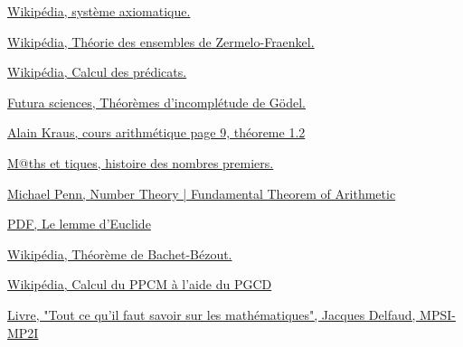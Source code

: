 \documentclass[12pt]{article}
\begin{document}
\begin{enumerate}[label=\text{[}\arabic*\text{]}]
\item \href{https://fr.wikipedia.org/wiki/Système_axiomatique}{Wikipédia, système axiomatique.} \label{itm:SysAxi}

\item \href{https://fr.wikipedia.org/wiki/Théorie_des_ensembles_de_Zermelo-Fraenkel}{Wikipédia, Théorie des ensembles de Zermelo-Fraenkel.} \label{itm:ThrZFC}

\item \href{https://fr.wikipedia.org/wiki/Calcul_des_prédicats}{Wikipédia, Calcul des prédicats.} \label{itm:CalPre}

\item \href{https://www.futura-sciences.com/sciences/definitions/mathematiques-theoreme-incompletude-godel-13701/}{Futura sciences, Théorèmes d'incomplétude de Gödel.} \label{itm:ThmGdl}

\item \href{https://webusers.imj-prg.fr/~alberto.minguez/Enseignement/Arithmetique_files/Cours-lm220-Kraus.pdf}{Alain Kraus, cours arithmétique page 9, théoreme 1.2} \label{itm:divprem} 

\item \href{https://www.maths-et-tiques.fr/index.php/histoire-des-maths/nombres/les-nombres-premiers}{M@ths et tiques, histoire des nombres premiers.} \label{histoire}

\item \href{https://www.youtube.com/watch?v=VkhJp2Ue_r0&t=114s}{Michael Penn, Number Theory | Fundamental Theorem of Arithmetic} \label{itm:FunAri}

\item \href{https://www.imo.universite-paris-saclay.fr/~perrin/CAPES/arithmetique/lemmeEuclide.pdf}{PDF, Le lemme d'Euclide} \label{itm:LemEuc}

\item \href{https://fr.wikipedia.org/wiki/Théorème_de_Bachet-Bézout}{Wikipédia, Théorème de Bachet-Bézout.} \label{itm:ThmBaBe}

\item \href{https://fr.wikipedia.org/wiki/Plus_petit_commun_multiple#\%C3\%80_l'aide_du_PGCD}{Wikipédia, Calcul du PPCM à l'aide du PGCD} \label{itm:ppcm_aide_pgcd}

\item \href{https://livre.fnac.com/a15900019/Mustapha-Boukhobza-Tout-ce-qu-il-faut-savoir-sur-les-mathematiques-en-MPSI-et-MP2I}{Livre, "Tout ce qu'il faut savoir sur les mathématiques", Jacques Delfaud, MPSI-MP2I}

\end{enumerate}



\end{document}
